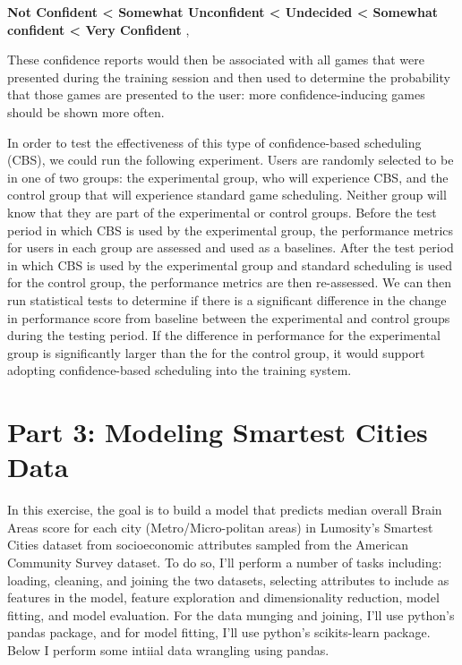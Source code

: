 \documentclass{article}
\begin{document}
\textbf{Not Confident \textless{} Somewhat Unconfident \textless{}
Undecided \textless{} Somewhat confident \textless{} Very Confident },

These confidence reports would then be associated with all games that
were presented during the training session and then used to determine
the probability that those games are presented to the user: more
confidence-inducing games should be shown more often.

In order to test the effectiveness of this type of confidence-based
scheduling (CBS), we could run the following experiment. Users are
randomly selected to be in one of two groups: the experimental group,
who will experience CBS, and the control group that will experience
standard game scheduling. Neither group will know that they are part of
the experimental or control groups. Before the test period in which CBS
is used by the experimental group, the performance metrics for users in
each group are assessed and used as a baselines. After the test period
in which CBS is used by the experimental group and standard scheduling
is used for the control group, the performance metrics are then
re-assessed. We can then run statistical tests to determine if there is
a significant difference in the change in performance score from
baseline between the experimental and control groups during the testing
period. If the difference in performance for the experimental group is
significantly larger than the for the control group, it would support
adopting confidence-based scheduling into the training system.

    \section{Part 3: Modeling Smartest Cities
Data}\label{part-3-modeling-smartest-cities-data}

In this exercise, the goal is to build a model that predicts median
overall Brain Areas score for each city (Metro/Micro-politan areas) in
Lumosity's Smartest Cities dataset from socioeconomic attributes sampled
from the American Community Survey dataset. To do so, I'll perform a
number of tasks including: loading, cleaning, and joining the two
datasets, selecting attributes to include as features in the model,
feature exploration and dimensionality reduction, model fitting, and
model evaluation. For the data munging and joining, I'll use python's
pandas package, and for model fitting, I'll use python's scikits-learn
package. Below I perform some intiial data wrangling using pandas.
\end{document}
